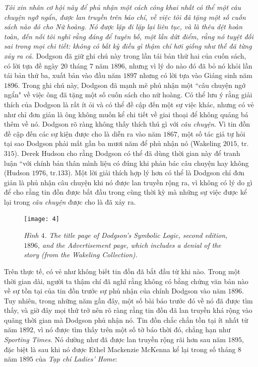 \begin{multicols}{2}
	\vskip 0.1cm
	\textit{Tôi xin nhân cơ hội này để phủ nhận một cách công khai nhất  có thể  một câu chuyện ngớ ngẩn, được lan truyền trên báo chí, về việc tôi đã tặng một số cuốn sách nào đó cho Nữ hoàng. Nó được lặp đi lặp lại liên tục, và là thêu dệt hoàn toàn, đến nỗi tôi nghĩ rằng đáng để tuyên bố, một lần dứt điểm, rằng nó tuyệt đối sai trong mọi chi tiết: không có bất kỳ điều gì thậm chí hơi giống như thế đã từng xảy ra cả.}
	\vskip 0.1cm
	Dodgson đã giữ ghi chú này trong lần tái bản thứ hai của cuốn sách, có lời tựa đề ngày $20$ tháng $7$ năm $1896$, nhưng vì lý do nào đó đã bỏ nó khỏi lần tái bản thứ ba, xuất bản vào đầu năm $1897$ nhưng có lời tựa vào Giáng sinh năm $1896$.
	\vskip 0.1cm
	Trong ghi chú này, Dodgson đã mạnh mẽ phủ nhận một ``câu chuyện ngớ ngẩn" về việc ông đã tặng một số cuốn sách cho nữ hoàng. Có thể lưu ý rằng giải thích của Dodgson là rất ít ỏi và có thể đề cập đến một sự việc khác, nhưng có vẻ như chỉ đơn giản là ông không muốn kể chi tiết về giai thoại để không quảng bá thêm về nó. Dodgson rõ ràng không thấy thích thú gì với \textit{câu chuyện}. Vì tin đồn đề cập đến các sự kiện được cho là diễn ra vào năm $1867$, một số tác giả tự hỏi tại sao Dodgson phải mất gần ba mươi năm để phủ nhận nó (Wakeling $2015$, tr. $315$). Derek Hudson cho rằng Dodgson có thể đã dùng thời gian này để tranh luận ``với chính bản thân mình liệu có đúng khi phản bác câu chuyện hay không (Hudson $1976$,  tr.$133$). Một lời giải thích hợp lý hơn có thể là Dodgson chỉ đơn giản là phủ nhận câu chuyện khi nó được lan truyền rộng ra, vì không có lý do gì để cho rằng tin đồn được bắt đầu trong cùng thời kỳ mà những sự việc được kể lại trong \textit{câu chuyện} được cho là đã xảy ra.
	\begin{figure}[H]
		\vspace*{-5pt}
		\centering
		\captionsetup{labelformat= empty, justification=centering}
		\texttt{[image: 4]}
		\caption{\small\textit{\color{quantoan}Hình $4$. The title page of Dodgson’s Symbolic Logic, second edition, $1896$, and the Advertisement page, which includes a denial of the story (from the Wakeling Collection).}}
		\vspace*{-10pt}
	\end{figure}
	Trên thực tế, có vẻ như không biết tin đồn đã bắt đầu từ khi nào. Trong một thời gian dài, người ta thậm chí đã nghĩ rằng không có bằng chứng văn bản nào về sự tồn tại của tin đồn trước sự phủ nhận của chính Dodgson vào năm $1896$. Tuy nhiên, trong những năm gần đây, một số bài báo trước đó về nó đã được tìm thấy, và giờ đây mọi thứ trở nên rõ ràng rằng tin đồn đã lan truyền khá rộng vào quãng thời gian mà Dodgson phủ nhận nó. Tin đồn chắc chắn tồn tại ít nhất từ năm $1892$, vì nó được tìm thấy trên một số tờ báo thời đó, chẳng hạn như \textit{Sporting Times}. Nó dường như đã được lan truyền rộng rãi hơn sau năm $1895$, đặc biệt là sau khi nó được Ethel Mackenzie McKenna kể lại trong số tháng $8$ năm $1895$ của \textit{Tạp chí Ladies’ Home}:

\end{multicols}
